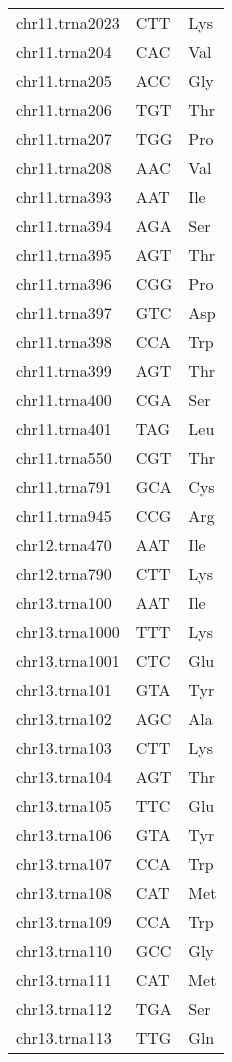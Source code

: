 \begin{longtable}{@{}l>{\collectcell\anticodon}l<{\endcollectcell}l@{}}
    chr11.trna2023 & CTT & Lys \\
    chr11.trna204 & CAC & Val \\
    chr11.trna205 & ACC & Gly \\
    chr11.trna206 & TGT & Thr \\
    chr11.trna207 & TGG & Pro \\
    chr11.trna208 & AAC & Val \\
    chr11.trna393 & AAT & Ile \\
    chr11.trna394 & AGA & Ser \\
    chr11.trna395 & AGT & Thr \\
    chr11.trna396 & CGG & Pro \\
    chr11.trna397 & GTC & Asp \\
    chr11.trna398 & CCA & Trp \\
    chr11.trna399 & AGT & Thr \\
    chr11.trna400 & CGA & Ser \\
    chr11.trna401 & TAG & Leu \\
    chr11.trna550 & CGT & Thr \\
    chr11.trna791 & GCA & Cys \\
    chr11.trna945 & CCG & Arg \\
    chr12.trna470 & AAT & Ile \\
    chr12.trna790 & CTT & Lys \\
    chr13.trna100 & AAT & Ile \\
    chr13.trna1000 & TTT & Lys \\
    chr13.trna1001 & CTC & Glu \\
    chr13.trna101 & GTA & Tyr \\
    chr13.trna102 & AGC & Ala \\
    chr13.trna103 & CTT & Lys \\
    chr13.trna104 & AGT & Thr \\
    chr13.trna105 & TTC & Glu \\
    chr13.trna106 & GTA & Tyr \\
    chr13.trna107 & CCA & Trp \\
    chr13.trna108 & CAT & Met \\
    chr13.trna109 & CCA & Trp \\
    chr13.trna110 & GCC & Gly \\
    chr13.trna111 & CAT & Met \\
    chr13.trna112 & TGA & Ser \\
    chr13.trna113 & TTG & Gln \\

\end{longtable}
